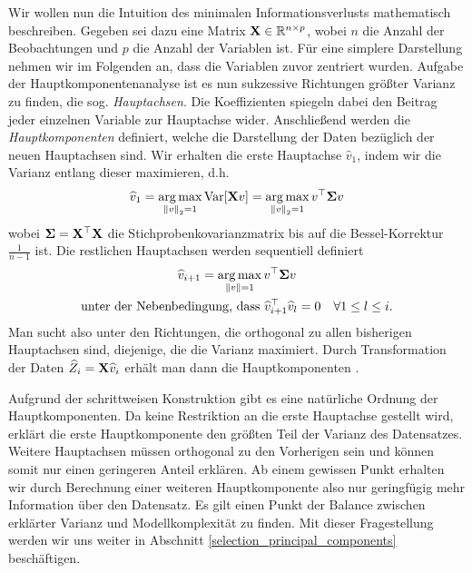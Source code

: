 Wir wollen nun die Intuition des minimalen Informationsverlusts mathematisch beschreiben. Gegeben sei dazu eine Matrix $\mathbf{X} \in \mathbb{R}^{n\times p}$, wobei $n$ die Anzahl der Beobachtungen und $p$ die Anzahl der Variablen ist. Für eine simplere Darstellung nehmen wir im Folgenden an, dass die Variablen zuvor zentriert wurden. Aufgabe der Hauptkomponentenanalyse ist es nun sukzessive Richtungen größter Varianz zu finden, die sog. \textit{Hauptachsen}. Die Koeffizienten spiegeln dabei den Beitrag jeder einzelnen Variable zur Hauptachse wider. Anschließend werden die \textit{Hauptkomponenten} definiert, welche die Darstellung der Daten bezüglich der neuen Hauptachsen sind. Wir erhalten die erste Hauptachse $\widehat{v}_1$, indem wir die Varianz entlang dieser maximieren, d.h.
\begin{align}
\label{pca_variance_maximization_first}
\widehat{v}_1 = \operatorname*{arg\,max}_{\left\lVert v \right\rVert_2 = 1} \operatorname{Var}[\mathbf{X}v] = \operatorname*{arg\,max}_{\left\lVert v \right\rVert_2 = 1} v^{\top} \mathbf{\Sigma} v
\end{align}
wobei $\mathbf{\Sigma} = \mathbf{X}^{\top}\mathbf{X}$ die Stichprobenkovarianzmatrix bis auf die Bessel-Korrektur $\frac{1}{n-1}$ ist. Die restlichen Hauptachsen werden sequentiell definiert
\begin{align}
\label{pca_variance_maximization_rest}
\begin{gathered}
\widehat{v}_{i+1} = \operatorname*{arg\,max}_{\left\lVert v \right\rVert = 1} v^{\top} \mathbf{\Sigma} v\\
\text{unter der Nebenbedingung, dass } \widehat{v}_{i+1}^{\top}\widehat{v}_l = 0 \quad \forall 1 \leq l \leq i.
\end{gathered}
\end{align}
Man sucht also unter den Richtungen, die orthogonal zu allen bisherigen Hauptachsen sind, diejenige, die die Varianz maximiert. Durch Transformation der Daten $\widehat{Z}_i = \mathbf{X}\widehat{v}_i$ erhält man dann die Hauptkomponenten \cite{vidal}.

Aufgrund der schrittweisen Konstruktion gibt es eine natürliche Ordnung der Hauptkomponenten. Da keine Restriktion an die erste Hauptachse gestellt wird, erklärt die erste Hauptkomponente den größten Teil der Varianz des Datensatzes. Weitere Hauptachsen müssen orthogonal zu den Vorherigen sein und können somit nur einen geringeren Anteil erklären. Ab einem gewissen Punkt erhalten wir durch Berechnung einer weiteren Hauptkomponente also nur geringfügig mehr Information über den Datensatz. Es gilt einen Punkt der Balance zwischen erklärter Varianz und Modellkomplexität zu finden. Mit dieser Fragestellung werden wir uns weiter in Abschnitt \ref{selection_principal_components} beschäftigen.

